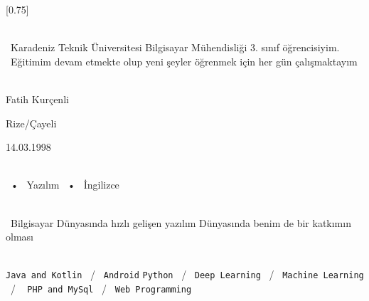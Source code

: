 \documentclass[lighthipster]{simplehipstercv}
\begin{document}
\setlength{\columnsep}{1.5cm}
[0.75]
\begin{paracol}{2}

\paracolbackgroundoptions



\footnotesize
{\setasidefontcolour
\flushright
\begin{center}
\end{center}

\\[0.5em]

{\footnotesize
\ Karadeniz Teknik Üniversitesi Bilgisayar Mühendisliği 3. sınıf öğrencisiyim. \ Eğitimim devam etmekte olup yeni şeyler öğrenmek için her gün çalışmaktayım}
\bigskip

 \\[0.5em]
Fatih Kurçenli

Rize/Çayeli

14.03.1998

\bigskip

 \\[0.5em]

 ~•~ Yazılım ~•~ İngilizce

\bigskip



\bigskip

\\[0.5em]

\ Bilgisayar Dünyasında hızlı gelişen yazılım Dünyasında benim de bir katkımın olması
\bigskip
\vspace{4em}

\\[0.5em]

\texttt{Java and Kotlin} ~/~ \texttt{Android}
\texttt{Python} ~/~ \texttt{Deep Learning} ~/~ \texttt{Machine Learning} ~/    ~      
\texttt{PHP and MySql} ~/~ \texttt{Web Programming}

\vspace{7em}

\phantom{turn the page}

}
\end{paracol}
\end{document}
